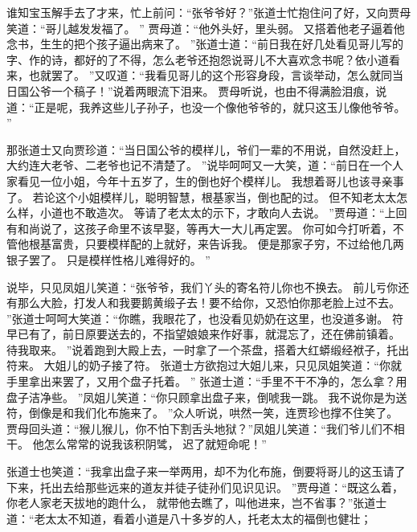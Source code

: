 谁知宝玉解手去了才来，忙上前问：“张爷爷好？”张道士忙抱住问了好，又向贾母笑道：“哥儿越发发福了。
”
贾母道：“他外头好，里头弱。
又搭着他老子逼着他念书，生生的把个孩子逼出病来了。
”张道士道：“前日我在好几处看见哥儿写的字、作的诗，都好的了不得，怎么老爷还抱怨说哥儿不大喜欢念书呢？依小道看来，也就罢了。
”又叹道：“我看见哥儿的这个形容身段，言谈举动，怎么就同当日国公爷一个稿子！”说着两眼流下泪来。
贾母听说，也由不得满脸泪痕，说道：“正是呢，我养这些儿子孙子，也没一个像他爷爷的，就只这玉儿像他爷爷。
”\par
那张道士又向贾珍道：“当日国公爷的模样儿，爷们一辈的不用说，自然没赶上，大约连大老爷、二老爷也记不清楚了。
”说毕呵呵又一大笑，道：“前日在一个人家看见一位小姐，今年十五岁了，生的倒也好个模样儿。
我想着哥儿也该寻亲事了。
若论这个小姐模样儿，聪明智慧，根基家当，倒也配的过。
但不知老太太怎么样，小道也不敢造次。
等请了老太太的示下，才敢向人去说。
”贾母道：“上回有和尚说了，这孩子命里不该早娶，等再大一大儿再定罢。
你可如今打听着，不管他根基富贵，只要模样配的上就好，来告诉我。
便是那家子穷，不过给他几两银子罢了。
只是模样性格儿难得好的。
”\par
说毕，只见凤姐儿笑道：“张爷爷，我们丫头的寄名符儿你也不换去。
前儿亏你还有那么大脸，打发人和我要鹅黄缎子去！要不给你，又恐怕你那老脸上过不去。
”张道士呵呵大笑道：“你瞧，我眼花了，也没看见奶奶在这里，也没道多谢。
符早已有了，前日原要送去的，不指望娘娘来作好事，就混忘了，还在佛前镇着。
待我取来。
”说着跑到大殿上去，一时拿了一个茶盘，搭着大红蟒缎经袱子，托出符来。
大姐儿的奶子接了符。
张道士方欲抱过大姐儿来，只见凤姐笑道：“你就手里拿出来罢了，又用个盘子托着。
”
张道士道：“手里不干不净的，怎么拿？用盘子洁净些。
”凤姐儿笑道：“你只顾拿出盘子来，倒唬我一跳。
我不说你是为送符，倒像是和我们化布施来了。
”众人听说，哄然一笑，连贾珍也撑不住笑了。
贾母回头道：“猴儿猴儿，你不怕下割舌头地狱？”凤姐儿笑道：“我们爷儿们不相干。
他怎么常常的说我该积阴骘，
迟了就短命呢！”\par
张道士也笑道：“我拿出盘子来一举两用，却不为化布施，倒要将哥儿的这玉请了下来，托出去给那些远来的道友并徒子徒孙们见识见识。
”贾母道：“既这么着，你老人家老天拔地的跑什么，
就带他去瞧了，叫他进来，岂不省事？”张道士道：“老太太不知道，看着小道是八十多岁的人，托老太太的福倒也健壮；
